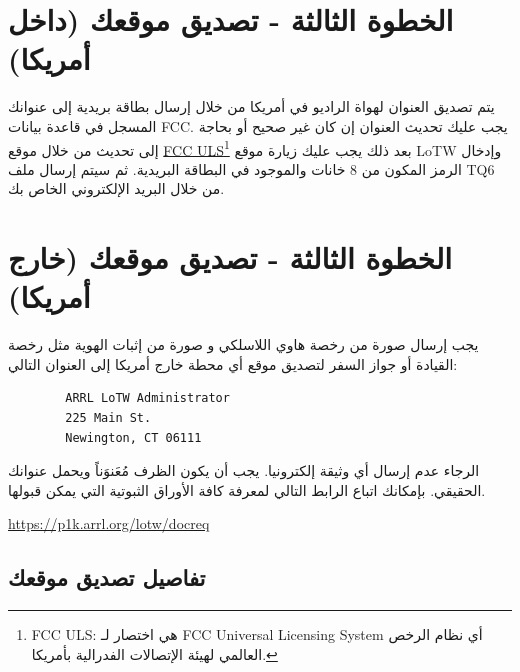 \documentclass[a4paper,12pt]{article}
\begin{document}
\section{الخطوة الثالثة - تصديق موقعك (داخل أمريكا)}
يتم تصديق العنوان لهواة الراديو في أمريكا من خلال إرسال بطاقة بريدية إلى
عنوانك المسجل في قاعدة بيانات \textenglish{FCC}. يجب عليك تحديث العنوان إن كان غير صحيح أو بحاجة إلى تحديث من خلال موقع  \href{http://wireless.fcc.gov/uls}{\textenglish{FCC ULS}\footnote{\textenglish{FCC ULS}: هي اختصار لـ \textenglish{FCC Universal Licensing System} أي نظام الرخص العالمي لهيئة الإتصالات الفدرالية بأمريكا.}} بعد ذلك يجب عليك زيارة موقع \textenglish{LoTW} وإدخال الرمز المكون من 8 خانات والموجود في
البطاقة البريدية. ثم سيتم إرسال ملف \textenglish{TQ6} من خلال البريد الإلكتروني الخاص بك.

\vspace{24pt}
\begin{center}
	\color{slategray2}
{\Huge\hrulefill\hspace{0.2cm} \floweroneright\floweroneleft \hspace{0.2cm} \hrulefill}
\end{center}
\vspace{24pt}
\section{الخطوة الثالثة - تصديق موقعك (خارج أمريكا)}

يجب إرسال صورة من رخصة هاوي اللاسلكي و صورة من إثبات الهوية مثل رخصة
القيادة أو جواز السفر لتصديق موقع أي محطة خارج أمريكا إلى العنوان
التالي:

\begin{flushleft}
	\begin{verbatim}
		ARRL LoTW Administrator
		225 Main St.
		Newington, CT 06111
	\end{verbatim}
\end{flushleft}

الرجاء عدم إرسال أي وثيقة إلكترونيا. يجب أن يكون الظرف مُعَنوَناً ويحمل
عنوانك الحقيقي. بإمكانك اتباع الرابط التالي لمعرفة كافة الأوراق الثبوتية التي يمكن
قبولها.\par
\href{https://p1k.arrl.org/lotw/docreq}{https://p1k.arrl.org/lotw/docreq}

\vspace{18pt}
\begin{center}
	\color{slategray2}
{\Huge \decoone}
\end{center}

\subsection{تفاصيل تصديق موقعك}
\end{document}
